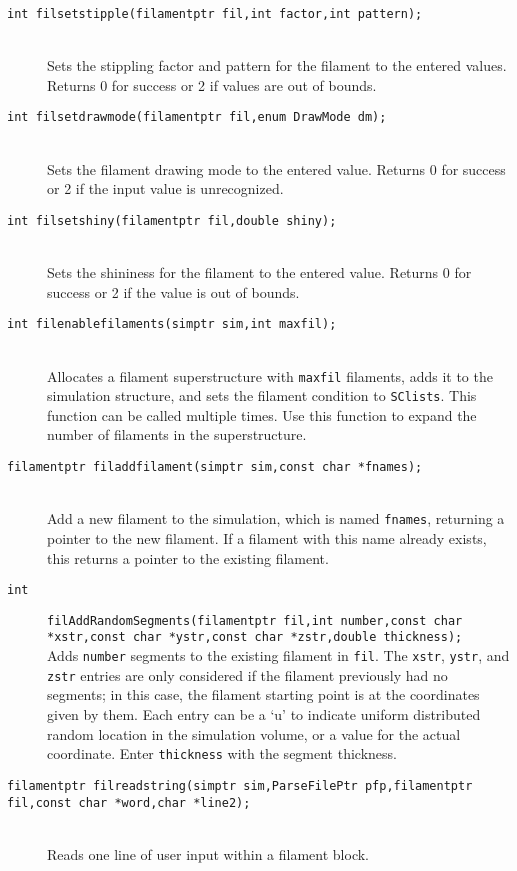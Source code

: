 \documentclass {book}
\begin{document}
\begin{description}
\item[\texttt{int filsetstipple(filamentptr fil,int factor,int pattern);}]
\hfill \\
Sets the stippling factor and pattern for the filament to the entered values. Returns 0 for success or 2 if values are out of bounds.

\item[\texttt{int filsetdrawmode(filamentptr fil,enum DrawMode dm);}]
\hfill \\
Sets the filament drawing mode to the entered value. Returns 0 for success or 2 if the input value is unrecognized.

\item[\texttt{int filsetshiny(filamentptr fil,double shiny);}]
\hfill \\
Sets the shininess for the filament to the entered value. Returns 0 for success or 2 if the value is out of bounds.

\item[\texttt{int filenablefilaments(simptr sim,int maxfil);}]
\hfill \\
Allocates a filament superstructure with \texttt{maxfil} filaments, adds it to the simulation structure, and sets the filament condition to \texttt{SClists}. This function can be called multiple times. Use this function to expand the number of filaments in the superstructure.

\item[\texttt{filamentptr filaddfilament(simptr sim,const char *fnames);}]
\hfill \\
Add a new filament to the simulation, which is named \texttt{fnames}, returning a pointer to the new filament. If a filament with this name already exists, this returns a pointer to the existing filament.

\item[\texttt{int}]
\texttt{filAddRandomSegments(filamentptr fil,int number,const char *xstr,const char *ystr,const char *zstr,double thickness);}
\hfill \\
Adds \texttt{number} segments to the existing filament in \texttt{fil}. The \texttt{xstr}, \texttt{ystr}, and \texttt{zstr} entries are only considered if the filament previously had no segments; in this case, the filament starting point is at the coordinates given by them. Each entry can be a `u' to indicate uniform distributed random location in the simulation volume, or a value for the actual coordinate. Enter \texttt{thickness} with the segment thickness.

\item[\texttt{filamentptr filreadstring(simptr sim,ParseFilePtr pfp,filamentptr fil,const char *word,char *line2);}]
\hfill \\
Reads one line of user input within a filament block.


\end{description}
\end{document}
